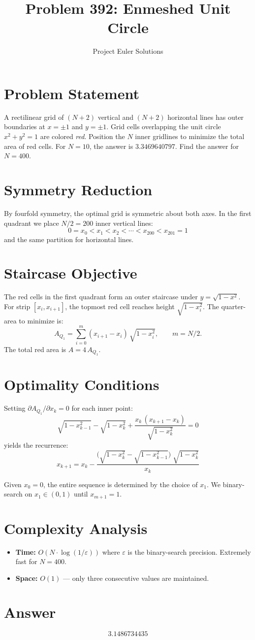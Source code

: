 \documentclass[11pt]{article}
\title{Problem 392: Enmeshed Unit Circle}
\author{Project Euler Solutions}
\date{}
\begin{document}
\maketitle

\section{Problem Statement}
A rectilinear grid of $(N+2)$ vertical and $(N+2)$ horizontal lines has outer boundaries at $x = \pm 1$ and $y = \pm 1$. Grid cells overlapping the unit circle $x^2 + y^2 = 1$ are colored \emph{red}. Position the $N$ inner gridlines to minimize the total area of red cells. For $N = 10$, the answer is $3.3469640797$. Find the answer for $N = 400$.

\section{Symmetry Reduction}
By fourfold symmetry, the optimal grid is symmetric about both axes. In the first quadrant we place $N/2 = 200$ inner vertical lines:
\[
0 = x_0 < x_1 < x_2 < \cdots < x_{200} < x_{201} = 1
\]
and the same partition for horizontal lines.

\section{Staircase Objective}
The red cells in the first quadrant form an outer staircase under $y = \sqrt{1 - x^2}$. For strip $[x_i, x_{i+1}]$, the topmost red cell reaches height $\sqrt{1 - x_i^2}$. The quarter-area to minimize is:
\[
A_{Q_1} = \sum_{i=0}^{m} (x_{i+1} - x_i)\,\sqrt{1 - x_i^2}, \qquad m = N/2.
\]
The total red area is $A = 4\,A_{Q_1}$.

\section{Optimality Conditions}
Setting $\partial A_{Q_1}/\partial x_k = 0$ for each inner point:
\[
\sqrt{1 - x_{k-1}^2} - \sqrt{1 - x_k^2} + \frac{x_k\,(x_{k+1} - x_k)}{\sqrt{1 - x_k^2}} = 0
\]
yields the recurrence:
\[
x_{k+1} = x_k - \frac{\bigl(\sqrt{1 - x_k^2} - \sqrt{1 - x_{k-1}^2}\bigr)\;\sqrt{1 - x_k^2}}{x_k}
\]

Given $x_0 = 0$, the entire sequence is determined by the choice of $x_1$. We binary-search on $x_1 \in (0,1)$ until $x_{m+1} = 1$.

\section{Complexity Analysis}
\begin{itemize}
    \item \textbf{Time:} $O(N \cdot \log(1/\varepsilon))$ where $\varepsilon$ is the binary-search precision. Extremely fast for $N = 400$.
    \item \textbf{Space:} $O(1)$ --- only three consecutive values are maintained.
\end{itemize}

\section{Answer}

\[
\boxed{3.1486734435}
\]
\end{document}
